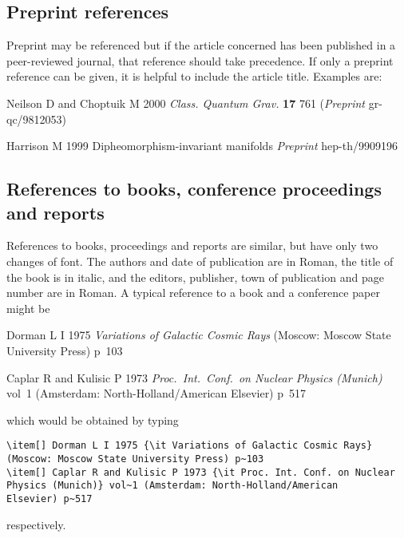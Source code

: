 \documentclass[12pt]{iopart}
\begin{document}
\subsection{Preprint references}
Preprint may be referenced but if the article concerned has been published in a peer-reviewed journal, that reference should take precedence. If only a preprint reference can be given, it is helpful to include the article title. Examples are:
\vskip6pt
\item Neilson D and Choptuik M 2000 {\it Class. Quantum Grav.} {\bf 17} 761 ({\it Preprint} gr-qc/9812053)
\item Harrison M 1999 Dipheomorphism-invariant manifolds {\it Preprint} hep-th/9909196
\endnumrefs

\subsection{References to books, conference proceedings and reports}

References to books, proceedings and reports are similar, but have only two
changes of font. The authors and date of publication are in Roman, the 
title of the book is in italic, and the editors, publisher, 
town of publication 
and page number are in Roman. A typical reference to a book and a
conference paper might be

\smallskip
\begin{harvard}
\item[] Dorman L I 1975 {\it Variations of Galactic Cosmic Rays} 
(Moscow: Moscow State University Press) p~103
\item[] Caplar R and Kulisic P 1973 {\it Proc.\
Int.\ Conf.\ on Nuclear Physics (Munich)} vol~1 (Amsterdam:  
North-Holland/American Elsevier) p~517
\end{harvard}
\smallskip

\noindent which would be obtained by typing
\small\begin{verbatim}
\item[] Dorman L I 1975 {\it Variations of Galactic Cosmic Rays} 
(Moscow: Moscow State University Press) p~103
\item[] Caplar R and Kulisic P 1973 {\it Proc. Int. Conf. on Nuclear 
Physics (Munich)} vol~1 (Amsterdam: North-Holland/American 
Elsevier) p~517
\end{verbatim}\normalsize
\noindent respectively.
\end{document}
